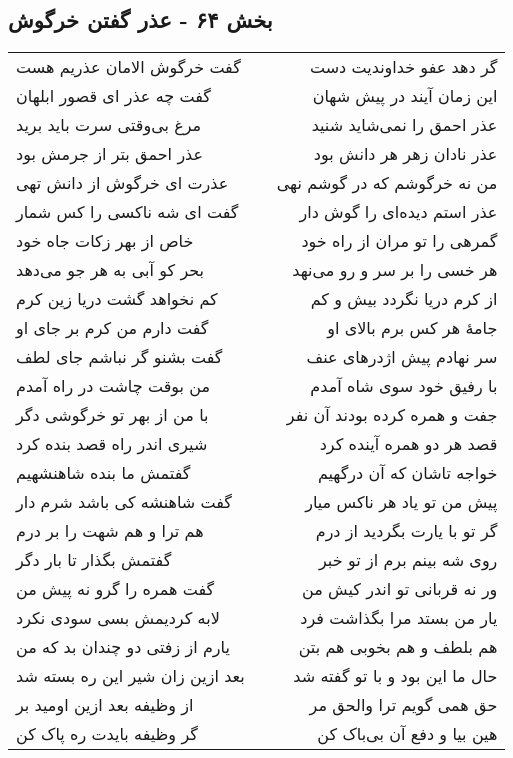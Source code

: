 \begin{center}
\section*{بخش ۶۴ - عذر گفتن خرگوش}
\label{sec:sh064}
\begin{longtable}{l p{0.5cm} r}
گفت خرگوش الامان عذریم هست
&&
گر دهد عفو خداوندیت دست
\\
گفت چه عذر ای قصور ابلهان
&&
این زمان آیند در پیش شهان
\\
مرغ بی‌وقتی سرت باید برید
&&
عذر احمق را نمی‌شاید شنید
\\
عذر احمق بتر از جرمش بود
&&
عذر نادان زهر هر دانش بود
\\
عذرت ای خرگوش از دانش تهی
&&
من نه خرگوشم که در گوشم نهی
\\
گفت ای شه ناکسی را کس شمار
&&
عذر استم دیده‌ای را گوش دار
\\
خاص از بهر زکات جاه خود
&&
گمرهی را تو مران از راه خود
\\
بحر کو آبی به هر جو می‌دهد
&&
هر خسی را بر سر و رو می‌نهد
\\
کم نخواهد گشت دریا زین کرم
&&
از کرم دریا نگردد بیش و کم
\\
گفت دارم من کرم بر جای او
&&
جامهٔ هر کس برم بالای او
\\
گفت بشنو گر نباشم جای لطف
&&
سر نهادم پیش اژدرهای عنف
\\
من بوقت چاشت در راه آمدم
&&
با رفیق خود سوی شاه آمدم
\\
با من از بهر تو خرگوشی دگر
&&
جفت و همره کرده بودند آن نفر
\\
شیری اندر راه قصد بنده کرد
&&
قصد هر دو همره آینده کرد
\\
گفتمش ما بنده شاهنشهیم
&&
خواجه تاشان که آن درگهیم
\\
گفت شاهنشه کی باشد شرم دار
&&
پیش من تو یاد هر ناکس میار
\\
هم ترا و هم شهت را بر درم
&&
گر تو با یارت بگردید از درم
\\
گفتمش بگذار تا بار دگر
&&
روی شه بینم برم از تو خبر
\\
گفت همره را گرو نه پیش من
&&
ور نه قربانی تو اندر کیش من
\\
لابه کردیمش بسی سودی نکرد
&&
یار من بستد مرا بگذاشت فرد
\\
یارم از زفتی دو چندان بد که من
&&
هم بلطف و هم بخوبی هم بتن
\\
بعد ازین زان شیر این ره بسته شد
&&
حال ما این بود و با تو گفته شد
\\
از وظیفه بعد ازین اومید بر
&&
حق همی گویم ترا والحق مر
\\
گر وظیفه بایدت ره پاک کن
&&
هین بیا و دفع آن بی‌باک کن
\\
\end{longtable}
\end{center}
